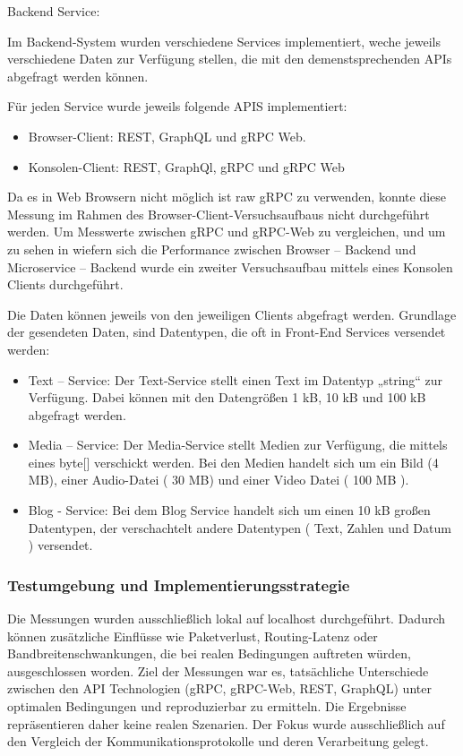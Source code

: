 Backend Service:

Im Backend-System wurden verschiedene Services implementiert, weche jeweils verschiedene Daten zur Verfügung stellen, die mit den demenstsprechenden APIs abgefragt werden können. 

Für jeden Service wurde jeweils folgende APIS implementiert:


\begin{itemize}
	\item Browser-Client: REST, GraphQL und gRPC Web. 
	\item Konsolen-Client: REST, GraphQl, gRPC und gRPC Web
\end{itemize}

Da es in Web Browsern nicht möglich ist raw gRPC zu verwenden, konnte diese Messung im Rahmen des Browser-Client-Versuchsaufbaus nicht durchgeführt werden. Um Messwerte zwischen gRPC und gRPC-Web zu vergleichen, und um zu sehen in wiefern sich die Performance zwischen Browser – Backend und Microservice – Backend wurde ein zweiter Versuchsaufbau mittels eines Konsolen Clients durchgeführt.

Die Daten können jeweils von den jeweiligen Clients abgefragt werden. Grundlage der gesendeten Daten, sind Datentypen, die oft in Front-End Services versendet werden:

\begin{itemize}
	\item Text – Service: 
	Der Text-Service stellt einen Text im Datentyp „string“ zur Verfügung. Dabei können mit den Datengrößen 1 kB, 10 kB und 100 kB abgefragt werden.
	
	\item Media – Service:
	Der Media-Service stellt Medien zur Verfügung, die mittels eines byte[] verschickt werden. Bei den Medien handelt sich um ein Bild (4 MB), einer Audio-Datei ( 30 MB) und einer Video Datei ( 100 MB ). 
	
	\item Blog - Service: 
	Bei dem Blog Service handelt sich um einen 10 kB großen Datentypen, der verschachtelt andere Datentypen ( Text, Zahlen und Datum ) versendet.
	
\end{itemize}

\subsubsection{Testumgebung und Implementierungsstrategie}
Die Messungen wurden ausschließlich lokal auf localhost durchgeführt. Dadurch können zusätzliche Einflüsse wie Paketverlust, Routing-Latenz oder Bandbreitenschwankungen, die bei realen Bedingungen auftreten würden, ausgeschlossen worden. Ziel der Messungen war es, tatsächliche Unterschiede zwischen den API Technologien (gRPC, gRPC-Web, REST, GraphQL) unter optimalen Bedingungen und reproduzierbar zu ermitteln.
Die Ergebnisse repräsentieren daher keine realen Szenarien. Der Fokus wurde ausschließlich auf den Vergleich der Kommunikationsprotokolle und deren Verarbeitung gelegt.

